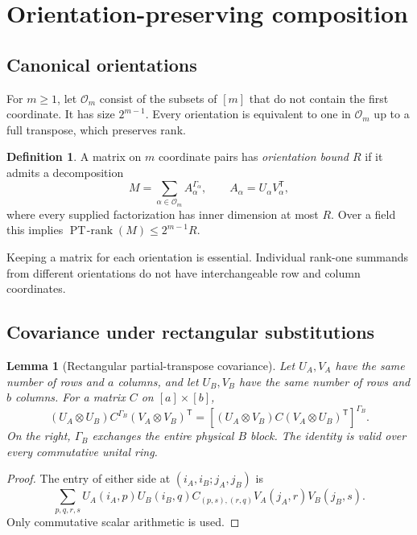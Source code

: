 \documentclass[11pt]{article}
\newtheorem{lemma}[theorem]{Lemma}
\theoremstyle{definition}
\newtheorem{definition}[theorem]{Definition}
\theoremstyle{remark}
\newcommand{\PT}{\operatorname{PT\!\text{-}rank}}
\newcommand{\Ori}{\mathcal O}
\newcommand{\trsp}{\mathsf T}
\begin{document}
\section{Orientation-preserving composition}

\subsection{Canonical orientations}

For $m\ge1$, let $\Ori_m$ consist of the subsets of $[m]$ that do
not contain the first coordinate. It has size $2^{m-1}$. Every
orientation is equivalent to one in $\Ori_m$ up to a full
transpose, which preserves rank.

\begin{definition}
A matrix on $m$ coordinate pairs has \emph{orientation bound $R$}
if it admits a decomposition
\begin{equation}
\label{eq:orientation-bound}
 M=\sum_{\alpha\in\Ori_m}A_\alpha^{\Gamma_\alpha},
 \qquad A_\alpha=U_\alpha V_\alpha^{\trsp},
\end{equation}
where every supplied factorization has inner dimension at most
$R$. Over a field this implies
$\PT(M)\le2^{m-1}R$.
\end{definition}

Keeping a matrix for each orientation is essential. Individual
rank-one summands from different orientations do not have
interchangeable row and column coordinates.

\subsection{Covariance under rectangular substitutions}

\begin{lemma}[Rectangular partial-transpose covariance]
\label{lem:covariance}
Let $U_A,V_A$ have the same number of rows and $a$ columns, and
let $U_B,V_B$ have the same number of rows and $b$ columns. For a
matrix $C$ on $[a]\times[b]$,
\begin{equation}
\label{eq:covariance}
 (U_A\otimes U_B)C^{\Gamma_B}(V_A\otimes V_B)^{\trsp}
 =\left[(U_A\otimes V_B)C(V_A\otimes U_B)^{\trsp}\right]^{\Gamma_B}.
\end{equation}
On the right, $\Gamma_B$ exchanges the entire physical $B$ block.
The identity is valid over every commutative unital ring.
\end{lemma}

\begin{proof}
The entry of either side at $(i_A,i_B;j_A,j_B)$ is
\[
 \sum_{p,q,r,s}
 U_A(i_A,p)U_B(i_B,q)
 C_{(p,s),(r,q)}
 V_A(j_A,r)V_B(j_B,s).
\]
Only commutative scalar arithmetic is used.
\end{proof}
\end{document}
